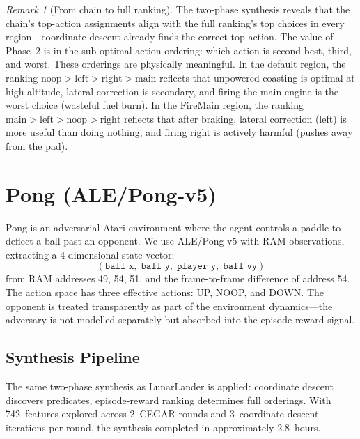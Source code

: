 \documentclass[9pt,a4paper]{article}
\theoremstyle{plain}
\theoremstyle{definition}
\theoremstyle{remark}
\newtheorem{remark}{Remark}
\begin{document}
\begin{remark}[From chain to full ranking]
The two-phase synthesis reveals that the chain's top-action
assignments align with the full ranking's top choices in every
region---coordinate descent already finds the correct top action.
The value of Phase~2 is in the sub-optimal action ordering: which
action is second-best, third, and worst. These orderings are
physically meaningful. In the default region, the ranking
$\text{noop} > \text{left} > \text{right} > \text{main}$
reflects that unpowered coasting is optimal at high altitude,
lateral correction is secondary, and firing the main engine is
the worst choice (wasteful fuel burn). In the FireMain region,
the ranking $\text{main} > \text{left} > \text{noop} > \text{right}$
reflects that after braking, lateral correction (left) is more
useful than doing nothing, and firing right is actively harmful
(pushes away from the pad).
\end{remark}

\section{Pong (ALE/Pong-v5)}
\label{sec:pong}

Pong is an adversarial Atari environment where the agent controls
a paddle to deflect a ball past an opponent. We use ALE/Pong-v5
with RAM observations, extracting a 4-dimensional state vector:
\[
  (\mathtt{ball\_x},\; \mathtt{ball\_y},\;
   \mathtt{player\_y},\; \mathtt{ball\_vy})
\]
from RAM addresses 49, 54, 51, and the frame-to-frame difference
of address 54. The action space has three effective actions:
UP, NOOP, and DOWN. The opponent is treated transparently as
part of the environment dynamics---the adversary is not modelled
separately but absorbed into the episode-reward signal.

\subsection{Synthesis Pipeline}

The same two-phase synthesis as LunarLander is applied:
coordinate descent discovers predicates, episode-reward ranking
determines full orderings. With 742~features explored across
2~CEGAR rounds and 3~coordinate-descent iterations per round,
the synthesis completed in approximately 2.8~hours.
\end{document}
